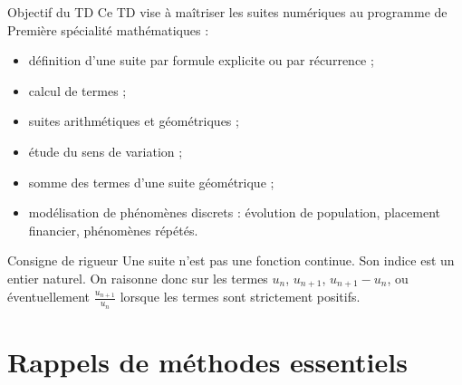 \documentclass[11pt,a4paper]{article}
\begin{document}
\begin{center}
\end{center}

\vspace{0.5cm}

\begin{rememberbox}{Objectif du TD}
Ce TD vise à maîtriser les suites numériques au programme de Première spécialité mathématiques :
\begin{itemize}
  \item définition d'une suite par formule explicite ou par récurrence ;
  \item calcul de termes ;
  \item suites arithmétiques et géométriques ;
  \item étude du sens de variation ;
  \item somme des termes d'une suite géométrique ;
  \item modélisation de phénomènes discrets : évolution de population, placement financier, phénomènes répétés.
\end{itemize}
\end{rememberbox}

\begin{warningbox}{Consigne de rigueur}
Une suite n'est pas une fonction continue. Son indice est un entier naturel. On raisonne donc sur les termes \(u_n\), \(u_{n+1}\), \(u_{n+1}-u_n\), ou éventuellement \(\frac{u_{n+1}}{u_n}\) lorsque les termes sont strictement positifs.
\end{warningbox}

\tableofcontents
\newpage

\section{Rappels de méthodes essentiels}
\end{document}
